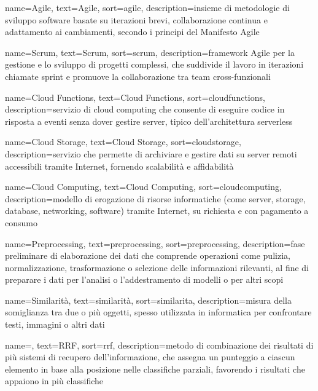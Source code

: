  {
    name=Agile,
    text=Agile,
    sort=agile,
    description={insieme di metodologie di sviluppo software basate su iterazioni brevi, collaborazione continua e adattamento ai cambiamenti, secondo i principi del Manifesto Agile}
}

 {
    name=Scrum,
    text=Scrum,
    sort=scrum,
    description={framework Agile per la gestione e lo sviluppo di progetti complessi, che suddivide il lavoro in iterazioni chiamate sprint e promuove la collaborazione tra team cross-funzionali}
}

 {
    name=Cloud Functions,
    text=Cloud Functions,
    sort=cloudfunctions,
    description={servizio di cloud computing che consente di eseguire codice in risposta a eventi senza dover gestire server, tipico dell'architettura serverless}
}

 {
    name=Cloud Storage,
    text=Cloud Storage,
    sort=cloudstorage,
    description={servizio che permette di archiviare e gestire dati su server remoti accessibili tramite Internet, fornendo scalabilità e affidabilità}
}

 {
    name=Cloud Computing,
    text=Cloud Computing,
    sort=cloudcomputing,
    description={modello di erogazione di risorse informatiche (come server, storage, database, networking, software) tramite Internet, su richiesta e con pagamento a consumo}
}

 {
    name=Preprocessing,
    text=preprocessing,
    sort=preprocessing,
    description={fase preliminare di elaborazione dei dati che comprende operazioni come pulizia, normalizzazione, trasformazione o selezione delle informazioni rilevanti, al fine di preparare i dati per l'analisi o l'addestramento di modelli o per altri scopi}
}

 {
    name=Similarità,
    text=similarità,
    sort=similarita,
    description={misura della somiglianza tra due o più oggetti, spesso utilizzata in informatica per confrontare testi, immagini o altri dati}
}

 {
    name=,
    text=RRF,
    sort=rrf,
    description={metodo di combinazione dei risultati di più sistemi di recupero dell'informazione, che assegna un punteggio a ciascun elemento in base alla posizione nelle classifiche parziali, favorendo i risultati che appaiono in più classifiche}
}

